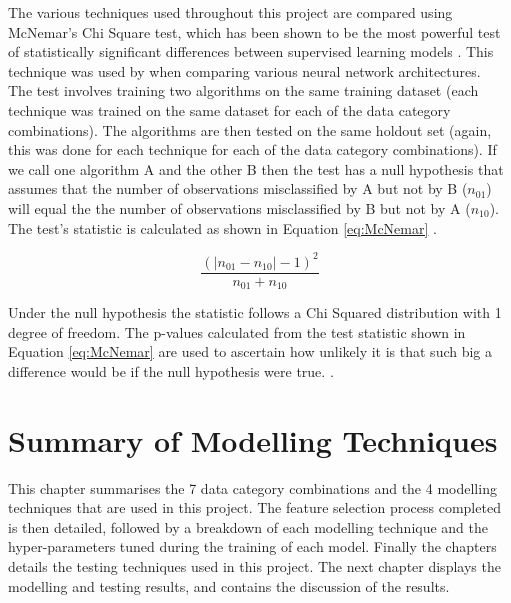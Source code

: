 The various techniques used throughout this project are compared using McNemar's Chi Square test, which has been shown to be the most powerful test of statistically significant differences between supervised learning models \parencite{Test}. This technique was used by \textcite{NNWest} when comparing various neural network architectures.  \\

The test involves training two algorithms on the same training dataset (each technique was trained on the same dataset for each of the data category combinations). The algorithms are then tested on the same holdout set (again, this was done for each technique for each of the data category combinations). If we call one algorithm A and the other B then the test has a null hypothesis that assumes that the number of observations misclassified by A but not by B ($n_{01}$) will equal the the number of observations misclassified by B but not by A ($n_{10}$). The test's statistic is calculated as shown in Equation \ref{eq:McNemar} \parencite{Test}.


\vspace{10pt}

\begin{equation} \label{eq:McNemar}
\dfrac{(|n_{01}-n_{10}|-1)^2}{n_{01}+n_{10}}
\end{equation}

\vspace{15pt}

Under the null hypothesis the statistic follows a Chi Squared distribution with 1 degree of freedom. The p-values calculated from the test statistic shown in Equation \ref{eq:McNemar} are used to ascertain how unlikely it is that such big a difference would be if the null hypothesis were true. \parencite{Test}. 


\section{Summary of Modelling Techniques}

This chapter summarises the 7 data category combinations and the 4 modelling techniques that are used in this project. The feature selection process completed is then detailed, followed by a breakdown of each modelling technique and the hyper-parameters tuned during the training of each model. Finally the chapters details the testing techniques used in this project. The next chapter displays the modelling and testing results, and contains the discussion of the results. 